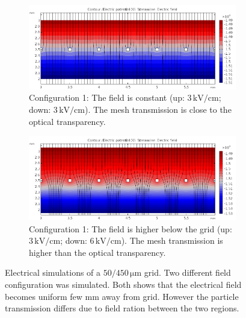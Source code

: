 \begin{figure}[!ht]
	\centering
	\begin{subfigure}{\textwidth}
		\includegraphics[width=\textwidth]{03_Prototype/figures/fig027_Grid1.png}
		\caption[]{Configuration 1: The field is constant (up: \(3\,\mathrm{kV/cm}\); down: \(3\,\mathrm{kV/cm}\)). The mesh transmission is close to the optical transparency.}
		\label{chap3:Grid1}
	\end{subfigure}

	\begin{subfigure}{\textwidth}
		\centering
		\includegraphics[width=\textwidth]{03_Prototype/figures/fig027_Grid2.png}
		\caption[]{Configuration 1: The field is higher below the grid (up: \(3\,\mathrm{kV/cm}\); down: \(6\,\mathrm{kV/cm}\)). The mesh transmission is higher than the optical transparency.}
		\label{chap3:Grid2}
	\end{subfigure}
	\caption[Electrical simulations of a \(50/450\,\mathrm{\mu m}\) grid]{Electrical simulations of a \(50/450\,\mathrm{\mu m}\) grid. Two different field configuration was simulated. Both shows that the electrical field becomes uniform few mm away from grid. However the particle transmission differs due to field ration between the two regions.}
	\label{chap3:Grid}
\end{figure}
